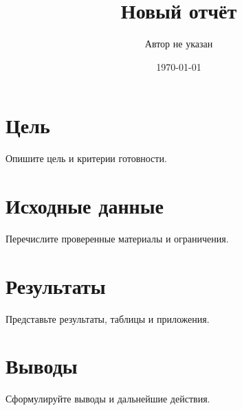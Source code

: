 \documentclass[11pt,a4paper]{report}
\title{Новый отчёт}
\author{Автор не указан}
\date{\today}
\begin{document}
\maketitle
\tableofcontents
\chapter{Цель}
Опишите цель и критерии готовности.
\chapter{Исходные данные}
Перечислите проверенные материалы и ограничения.
\chapter{Результаты}
Представьте результаты, таблицы и приложения.
\chapter{Выводы}
Сформулируйте выводы и дальнейшие действия.
\end{document}
